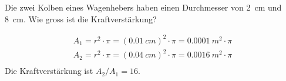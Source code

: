 \begin{aufgabe}
	Die zwei Kolben eines Wagenhebers haben einen Durchmesser von \SI{2}{cm} und \SI{8}{cm}.
	Wie gross ist die Kraftverstärkung?

	\begin{loesung}
		\begin{gather*}
			A_1=r^2\cdot\pi=(\SI{0.01}{cm})^2\cdot \pi=\SI{0.0001}{m^2}\cdot \pi\\
			A_2=r^2\cdot\pi=(\SI{0.04}{cm})^2\cdot \pi=\SI{0.0016}{m^2}\cdot \pi\\
		\end{gather*}
		Die Kraftverstärkung ist $A_2/A_1=16$.
	\end{loesung}
\end{aufgabe}


